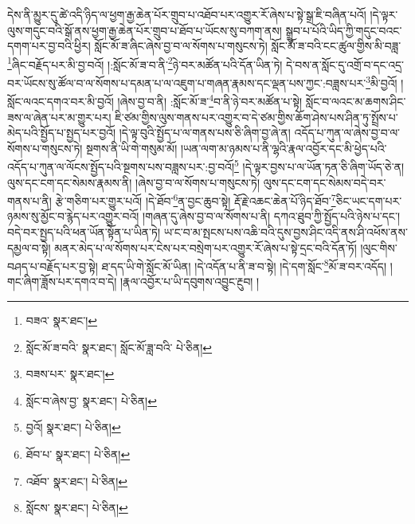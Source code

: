 དེས་ནི་མྱུར་དུ་ཚེ་འདི་ཉིད་ལ་ཕྱག་རྒྱ་ཆེན་པོར་གྲུབ་པ་འཐོབ་པར་འགྱུར་རོ་ཞེས་པ་སྟེ་སྒྲ་ཇི་བཞིན་པའོ། །དེ་ལྟར་ལུས་གདུང་བའི་སྒོ་ནས་ཕྱག་རྒྱ་ཆེན་པོར་གྲུབ་པ་ཐོབ་པ་ཡོངས་སུ་བཀག་ནས། སྒྲུབ་པ་པོའི་ཡིད་ཀྱི་གདུང་བའང་དགག་པར་བྱ་བའི་ཕྱིར། སློང་མོ་ཟ་ཞིང་ཞེས་བྱ་བ་ལ་སོགས་པ་གསུངས་ཏེ། སློང་མོ་ཟ་བའི་ངང་ཚུལ་གྱིས་མི་བཟླ་\footnote{བཟའ་  སྣར་ཐང་། }ཞིང་བརྗོད་པར་མི་བྱ་བའོ། །:སློང་མོ་ཟ་བ་ནི་\footnote{སློང་མོ་ཟ་བའི་  སྣར་ཐང་། སློང་མོ་ཟླ་བའི་  པེ་ཅིན། }ཉེ་བར་མཚོན་པའི་དོན་ཡིན་ཏེ། དེ་བས་ན་སློང་དུ་འགྲོ་བ་དང་འདྲ་བར་ཡོངས་སུ་ཚོལ་བ་ལ་སོགས་པ་དམན་པ་ལ་འཇུག་པ་གཞན་རྣམས་དང་ལྡན་པས་ཀྱང་:བཟླས་པར་\footnote{བཟས་པར་  སྣར་ཐང་། }མི་བྱའོ། །སློང་ལའང་དགའ་བར་མི་བྱའོ། །ཞེས་བྱ་བ་ནི། :སློང་མོ་ཟ་\footnote{སློང་བ་ཞེས་བྱ་  སྣར་ཐང་།  པེ་ཅིན། }བ་ནི་ཉེ་བར་མཚོན་པ་སྟེ། སློང་བ་ལའང་མ་ཆགས་ཤིང་ཟས་ལ་ཞེན་པར་མ་གྱུར་པར། ཇི་ཙམ་གྱིས་ལུས་གནས་པར་འགྱུར་བ་དེ་ཙམ་གྱིས་ཆོག་ཤེས་པས་ཤིན་ཏུ་སྤྲོས་པ་མེད་པའི་སྤྱོད་པ་སྤྱད་པར་བྱའོ། །དེ་ལྟ་བུའི་སྤྱོད་པ་ལ་གནས་པས་ཅི་ཞིག་བྱ་ཞེ་ན། འདོད་པ་ཀུན་ལ་ཞེས་བྱ་བ་ལ་སོགས་པ་གསུངས་ཏེ། སྔགས་ནི་ཡི་གེ་གསུམ་མོ། །ཡན་ལག་མ་ཉམས་པ་ནི་ལྷའི་རྣལ་འབྱོར་དང་མི་ཕྱེད་པའི་འདོད་པ་ཀུན་ལ་ལོངས་སྤྱོད་པའི་སྔགས་པས་བཟླས་པར་:བྱ་བའོ།\footnote{བྱའོ།  སྣར་ཐང་།  པེ་ཅིན། } །དེ་ལྟར་བྱས་པ་ལ་ཡོན་ཏན་ཅི་ཞིག་ཡོད་ཅེ་ན། ལུས་དང་ངག་དང་སེམས་རྣམས་ནི། །ཞེས་བྱ་བ་ལ་སོགས་པ་གསུངས་ཏེ། ལུས་དང་ངག་དང་སེམས་བདེ་བར་གནས་པ་ནི། རྩེ་གཅིག་པར་གྱུར་པའོ། །དེ་ཐོབ་\footnote{ཐོབ་པ་  སྣར་ཐང་།  པེ་ཅིན། }ན་བྱང་ཆུབ་སྟེ། རྡོ་རྗེ་འཆང་ཆེན་པོ་ཉིད་ཐོབ་\footnote{འཐོབ་  སྣར་ཐང་།  པེ་ཅིན། }ཅིང་ཡང་དག་པར་ཉམས་སུ་མྱོང་བ་རྙེད་པར་འགྱུར་བའོ། །གཞན་དུ་ཞེས་བྱ་བ་ལ་སོགས་པ་ནི། དཀའ་ཐུབ་ཀྱི་སྤྱོད་པའི་ཉེས་པ་དང་། བདེ་བར་སྤྱད་པའི་ཕན་ཡོན་སྟོན་པ་ཡིན་ཏེ། ཡ་ང་བ་མ་སྤངས་པས་འཆི་བའི་དུས་བྱས་ཤིང་འདི་ནས་ཤི་འཕོས་ནས་དམྱལ་བ་སྟེ། མནར་མེད་པ་ལ་སོགས་པར་ངེས་པར་བསྲེག་པར་འགྱུར་རོ་ཞེས་པ་སྟེ་དྲང་བའི་དོན་ཏོ། །ལུང་གིས་བཤད་པ་བརྗོད་པར་བྱ་སྟེ། ཐ་དད་ཡི་གེ་སློང་མོ་ཡིན། །དེ་འདོན་པ་ནི་ཟ་བ་སྟེ། །དེ་དག་སློང་\footnote{སློངས་  སྣར་ཐང་།  པེ་ཅིན། }མོ་ཟ་བར་འདོད། །གང་ཞིག་ཟློས་པར་དགའ་བ་དེ། །རྣལ་འབྱོར་པ་ཡི་དབུགས་འབྱུང་རྔུབ། །

